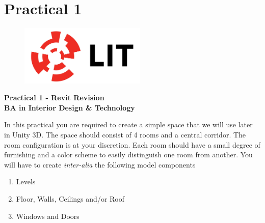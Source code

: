 \documentclass[a4paper, 10pt]{article}
\begin{document}
%
%


%



\lstset{language=HTML,
				basicstyle=\small,
				breaklines=true,
        numbers=left,
        numberstyle=\tiny,
        showstringspaces=false,
        aboveskip=-20pt,
        frame=leftline
        }
 

\newpage		
\section{Practical 1}

\newpage
\setcounter{page}{1}
\begin{center}
	\begin{figure}[ht]
		\centering
		\includegraphics[width = 6cm]{img/LITlogo.jpg}
		\label{fig:logoa1}
	\end{figure}
	\Large\textbf{Practical 1 - Revit Revision}\\
	\large\textbf{BA in Interior Design \& Technology}
\end{center}


In this practical you are required to create a simple space that we will use later in Unity 3D.  The space should consist of 4 rooms and a central corridor.  The room configuration is at your discretion.  Each room should have a small degree of furnishing and a color scheme to easily distinguish one room from another.  You will have to create \textit{inter-alia} the following model components


\begin{enumerate}
	\item Levels
	\item Floor, Walls, Ceilings and/or Roof
	\item Windows and Doors
\end{enumerate}
\end{document}
